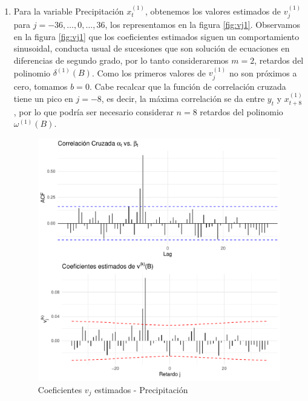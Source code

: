 \documentclass[12pt,oneside]{book}\usepackage[]{graphicx}\usepackage[]{color}
\makeatletter
\def\maxwidth{ %
  \ifdim\Gin@nat@width>\linewidth
    \linewidth
  \else
    \Gin@nat@width
  \fi
}
\newenvironment{knitrout}{}{} %
\theoremstyle{definition} %
\makeatother
\begin{document}
\begin{enumerate}


\item Para la variable Precipitación $x_t^{(1)}$, obtenemos los valores estimados de $v_j^{(1)}$ para $j=-36,\dots , 0, \dots, 36$, los representamos en la figura \ref{fig:vj1}. Observamos en la figura \ref{fig:vj1} que los coeficientes estimados siguen un comportamiento sinusoidal, conducta usual de sucesiones que son solución de ecuaciones en diferencias de segundo grado, por lo tanto consideraremos $m=2$, retardos del polinomio $\delta^{(1)}(B)$. Como los primeros valores de $v_j^{(1)}$ no son próximos a cero, tomamos $b=0$. Cabe recalcar que la función de correlación cruzada tiene un pico en $j=-8$, es decir, la máxima correlación se da entre $y_t$ y $x_{t+8}^{(1)}$, por lo que podría ser necesario considerar $n=8$ retardos del polinomio $\omega^{(1)}(B)$.



\begin{knitrout}
\color{fgcolor}\begin{figure}[H]

{\centering \includegraphics[width=\maxwidth]{figure/unnamed-chunk-40-1} 

}

\caption{\label{fig:vj1} Coeficientes $v_j$ estimados - Precipitación}\label{fig:unnamed-chunk-40}
\end{figure}



\end{knitrout}
\end{enumerate}
\end{document}
